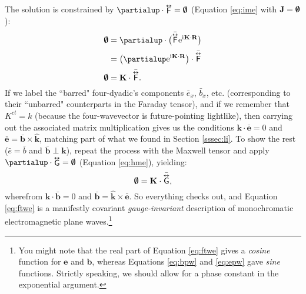 \documentclass[12pt]{article}
\renewcommand{\vv}[1]{\mathbf{#1}}
\newcommand{\tightoverset}[2]{%
  \mathop{#2}\limits^{\vbox to -.5ex{\kern-0.75ex\hbox{$#1$}\vss}}}
\newcommand{\inlinedy}[1]{\tightoverset{\text{\tiny$\bm\leftrightarrow$}}{#1}}
\newcommand{\capdy}[1]{ \overset{ \text{\tiny$\bm\leftrightarrow$} }{\vphantom{\text{\small{A}}}\smash{#1}} }
\begin{document}
The solution is constrained by $\partialup \cdot \inlinedy{\mathsf{F}} = \textrm{\mbox{\boldmath $\emptyset$}}$ (Equation \ref{eq:ime} with $\vv J = \textrm{\mbox{\boldmath $\emptyset$}}$):
\begin{equation*}
\begin{split}
\textrm{\mbox{\boldmath $\emptyset$}} &= \partialup \cdot \bigl( \bar{\capdy{\mathsf{F}}} \mathrm{e}^{\mathrm{i} \mkern.5mu \vv K \cdot \vv R} \bigr) \\[2pt]
&= \left( \partialup \mathrm{e}^{\mathrm{i} \mkern.5mu \vv K \cdot \vv R} \right) \cdot \bar{\capdy{\mathsf{F}}} \\[2pt]
\textrm{\mbox{\boldmath $\emptyset$}} &= \vv K \cdot \bar{\capdy{\mathsf{F}}} .
\end{split}
\end{equation*}
If we label the ``barred" four-dyadic's components $\bar{e}_x$, $\bar{b}_x$, etc. (corresponding to their ``unbarred" counterparts in the Faraday tensor), and if we remember that $K^{ct} = k$ (because the four-wavevector is future-pointing lightlike), then carrying out the associated matrix multiplication gives us the conditions $\vv k \cdot \bar{\vv e} = 0$ and ${\bar{\vv e} = \bar{\vv b} \times \vv{\hat k}}$, matching part of what we found in Section \ref{sssec:li}. To show the rest ($\bar{e} = \bar{b}$ and $\bar{\vv b} \perp \vv k$), repeat the process with the Maxwell tensor and apply $\partialup \cdot \inlinedy{\mathsf{G}} = \textrm{\mbox{\boldmath $\emptyset$}}$ (Equation \ref{eq:hme}), yielding:
\begin{equation*}
\textrm{\mbox{\boldmath $\emptyset$}} = \vv K \cdot \bar{\capdy{\mathsf{G}}} ,
\end{equation*}
wherefrom $\vv k \cdot \bar{\vv b} = 0$ and ${\bar{\vv b} = \vv{\hat k}} \times \bar{\vv e}$. So everything checks out, and Equation \ref{eq:ftwe} is a manifestly covariant \emph{gauge-invariant} description of monochromatic electromagnetic plane waves.\footnote{You might note that the real part of Equation \ref{eq:ftwe} gives a \emph{cosine} function for $\vv e$ and $\vv b$, whereas Equations \ref{eq:bpw} and \ref{eq:epw} gave \emph{sine} functions. Strictly speaking, we should allow for a phase constant in the exponential argument.}
\end{document}
